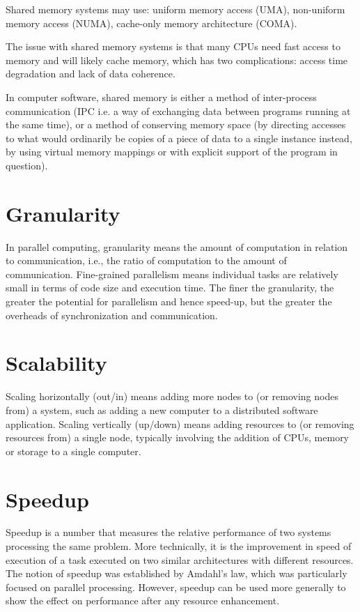 \documentclass{article}
\begin{document}
Shared memory systems may use: uniform memory access (UMA), non-uniform memory access (NUMA), cache-only memory architecture (COMA).

The issue with shared memory systems is that many CPUs need fast access to memory and will likely cache memory, which has two complications: access time degradation and lack of data coherence.

In computer software, shared memory is either a method of inter-process communication (IPC i.e. a way of exchanging data between programs running at the same time), or a method of conserving memory space (by directing accesses to what would ordinarily be copies of a piece of data to a single instance instead, by using virtual memory mappings or with explicit support of the program in question).

\section{Granularity}

In parallel computing, granularity means the amount of computation in relation to communication, i.e., the ratio of computation to the amount of communication. Fine-grained parallelism means individual tasks are relatively small in terms of code size and execution time. The finer the granularity, the greater the potential for parallelism and hence speed-up, but the greater the overheads of synchronization and communication.

\section{Scalability}

Scaling horizontally (out/in) means adding more nodes to (or removing nodes from) a system, such as adding a new computer to a distributed software application. Scaling vertically (up/down) means adding resources to (or removing resources from) a single node, typically involving the addition of CPUs, memory or storage to a single computer\cite{el2005advanced}.

\section{Speedup}

Speedup is a number that measures the relative performance of two systems processing the same problem. More technically, it is the improvement in speed of execution of a task executed on two similar architectures with different resources. The notion of speedup was established by Amdahl's law, which was particularly focused on parallel processing. However, speedup can be used more generally to show the effect on performance after any resource enhancement. 
\end{document}

